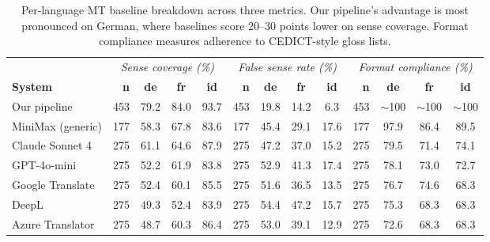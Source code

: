 \documentclass[11pt,a4paper]{article}
\begin{document}
\begin{table}[t]
\centering
\footnotesize
\begin{tabular}{lrccc@{\hskip 1.5em}rccc@{\hskip 1.5em}rccc}
\toprule
& \multicolumn{4}{c}{\textit{Sense coverage (\%)}} & \multicolumn{4}{c}{\textit{False sense rate (\%)}} & \multicolumn{4}{c}{\textit{Format compliance (\%)}} \\
\cmidrule(lr){2-5} \cmidrule(lr){6-9} \cmidrule(l){10-13}
\textbf{System} & \textbf{n} & \textbf{de} & \textbf{fr} & \textbf{id} & \textbf{n} & \textbf{de} & \textbf{fr} & \textbf{id} & \textbf{n} & \textbf{de} & \textbf{fr} & \textbf{id} \\
\midrule
Our pipeline      & 453 & 79.2 & 84.0 & 93.7 & 453 & 19.8 & 14.2 &  6.3 & 453 & ${\sim}$100 & ${\sim}$100 & ${\sim}$100 \\
MiniMax (generic)  & 177 & 58.3 & 67.8 & 83.6 & 177 & 45.4 & 29.1 & 17.6 & 177 & 97.9 & 86.4 & 89.5 \\
Claude Sonnet 4    & 275 & 61.1 & 64.6 & 87.9 & 275 & 47.2 & 37.0 & 15.2 & 275 & 79.5 & 71.4 & 74.1 \\
GPT-4o-mini        & 275 & 52.2 & 61.9 & 83.8 & 275 & 52.9 & 41.3 & 17.4 & 275 & 78.1 & 73.0 & 72.7 \\
Google Translate   & 275 & 52.4 & 60.1 & 85.5 & 275 & 51.6 & 36.5 & 13.5 & 275 & 76.7 & 74.6 & 68.3 \\
DeepL              & 275 & 49.3 & 52.4 & 83.9 & 275 & 54.4 & 47.2 & 15.7 & 275 & 75.3 & 68.3 & 68.3 \\
Azure Translator   & 275 & 48.7 & 60.3 & 86.4 & 275 & 53.0 & 39.1 & 12.9 & 275 & 72.6 & 68.3 & 68.3 \\
\bottomrule
\end{tabular}
\caption{Per-language MT baseline breakdown across three metrics. Our pipeline's advantage is most pronounced on German, where baselines score 20--30 points lower on sense coverage. Format compliance measures adherence to CEDICT-style gloss lists.}
\label{tab:mt-detail}
\end{table}
\end{document}

